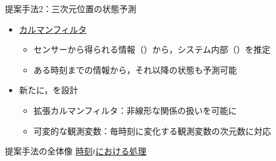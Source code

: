 \begin{frame}[noframenumbering]{提案手法2：三次元位置の状態予測}
    \begin{itemize}
        \item \uline{カルマンフィルタ}
        \begin{itemize}
            \item センサーから得られる情報（）から，システム内部（）を推定
            \item ある時刻までの情報から，それ以降の状態も予測可能
        \end{itemize}
    \end{itemize}   
    \begin{itemize}
        \item 新たに，を設計
        \begin{itemize}
            \item 拡張カルマンフィルタ：非線形な関係の扱いを可能に
            \item 可変的な観測変数：毎時刻に変化する観測変数の次元数に対応
        \end{itemize}
    \end{itemize} 
\end{frame}

\begin{frame}{提案手法の全体像}
    \uline{時刻$t$における処理}
\end{frame}
